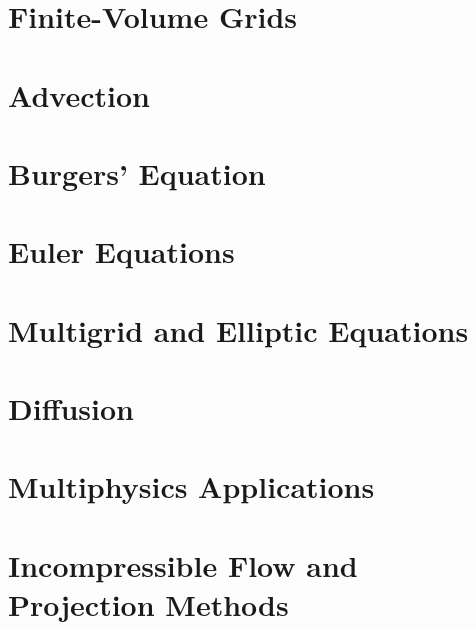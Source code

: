 \documentclass[11pt]{book}
\begin{document}


\chapter{Finite-Volume Grids}



\chapter{Advection}



\chapter{Burgers' Equation}



\chapter{Euler Equations}



\chapter{Multigrid and Elliptic Equations}



\chapter{Diffusion}



\chapter{Multiphysics Applications}



\chapter{Incompressible Flow and Projection Methods}
\end{document}
